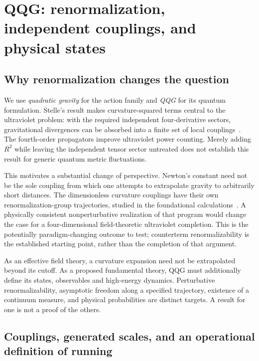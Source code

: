 \section{QQG: renormalization, independent couplings, and physical states}
\label{sec:parent-theory}

\subsection{Why renormalization changes the question}

We use \emph{quadratic gravity} for the action family and \emph{QQG} for its quantum formulation.  Stelle's result makes curvature-squared terms central to the ultraviolet problem: with the required independent four-derivative sectors, gravitational divergences can be absorbed into a finite set of local couplings~\cite{Stelle:1977ry}.  The fourth-order propagators improve ultraviolet power counting.  Merely adding $R^2$ while leaving the independent tensor sector untreated does not establish this result for generic quantum metric fluctuations.

This motivates a substantial change of perspective.  Newton's constant need not be the sole coupling from which one attempts to extrapolate gravity to arbitrarily short distances.  The dimensionless curvature couplings have their own renormalization-group trajectories, studied in the foundational calculations~\cite{FradkinTseytlin:1982,Avramidi:1985ki}.  A physically consistent nonperturbative realization of that program would change the case for a four-dimensional field-theoretic ultraviolet completion.  This is the potentially paradigm-changing outcome to test; counterterm renormalizability is the established starting point, rather than the completion of that argument.

As an effective field theory, a curvature expansion need not be extrapolated beyond its cutoff.  As a proposed fundamental theory, QQG must additionally define its states, observables and high-energy dynamics.  Perturbative renormalizability, asymptotic freedom along a specified trajectory, existence of a continuum measure, and physical probabilities are distinct targets.  A result for one is not a proof of the others.

\subsection{Couplings, generated scales, and an operational definition of running}
\label{sec:renormalization-couplings}

